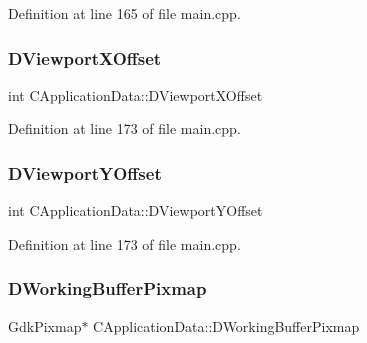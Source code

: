 Definition at line 165 of file main.\+cpp.

\hypertarget{classCApplicationData_a306bba873ccc47126111305fe21ef3ff}{}\label{classCApplicationData_a306bba873ccc47126111305fe21ef3ff} 
\subsubsection{\texorpdfstring{D\+Viewport\+X\+Offset}{DViewportXOffset}}
{\footnotesize\ttfamily int C\+Application\+Data\+::\+D\+Viewport\+X\+Offset\hspace{0.3cm}{\ttfamily [protected]}}



Definition at line 173 of file main.\+cpp.

\hypertarget{classCApplicationData_afc58ed96a1af813b28f6abf2c7d2dc72}{}\label{classCApplicationData_afc58ed96a1af813b28f6abf2c7d2dc72} 
\subsubsection{\texorpdfstring{D\+Viewport\+Y\+Offset}{DViewportYOffset}}
{\footnotesize\ttfamily int C\+Application\+Data\+::\+D\+Viewport\+Y\+Offset\hspace{0.3cm}{\ttfamily [protected]}}



Definition at line 173 of file main.\+cpp.

\hypertarget{classCApplicationData_afa34cf2780f38dd28c0c811e69d60a97}{}\label{classCApplicationData_afa34cf2780f38dd28c0c811e69d60a97} 
\subsubsection{\texorpdfstring{D\+Working\+Buffer\+Pixmap}{DWorkingBufferPixmap}}
{\footnotesize\ttfamily Gdk\+Pixmap$\ast$ C\+Application\+Data\+::\+D\+Working\+Buffer\+Pixmap\hspace{0.3cm}{\ttfamily [protected]}}




